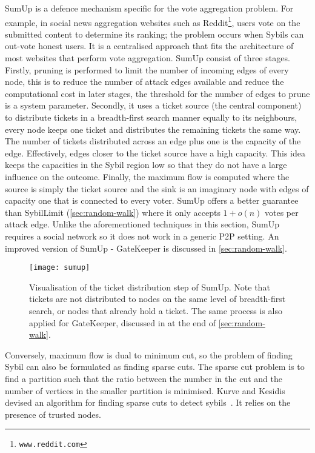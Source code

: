 SumUp\cite{tran2009sybil} is a defence mechanism specific for the vote
aggregation problem. For example, in social news aggregation websites such as
Reddit\footnote{\texttt{www.reddit.com}}, users vote on the submitted content to
determine its ranking; the problem occurs when Sybils can out-vote honest users.
It is a centralised approach that fits the architecture of most websites that
perform vote aggregation. SumUp consist of three stages. Firstly, pruning is
performed to limit the number of incoming edges of every node, this is to reduce
the number of attack edges available and reduce the computational cost in later
stages, the threshold for the number of edges to prune is a system parameter.
Secondly, it uses a ticket source (the central component) to distribute tickets
in a breadth-first search manner equally to its neighbours, every node keeps one
ticket and distributes the remaining tickets the same way. The number of tickets
distributed across an edge plus one is the capacity of the edge. Effectively,
edges closer to the ticket source have a high capacity. This idea keeps the
capacities in the Sybil region low so that they do not have a large influence on
the outcome. Finally, the maximum flow is computed where the source is simply
the ticket source and the sink is an imaginary node with edges of capacity one
that is connected to every voter. SumUp offers a better guarantee than
SybilLimit (\autoref{sec:random-walk}) where it only accepts $1 + o(n)$ votes
per attack edge. Unlike the aforementioned techniques in this section,
SumUp requires a social network so it does not work in a generic P2P setting. An
improved version of SumUp - GateKeeper is discussed in
\autoref{sec:random-walk}.

\begin{figure}
  \centering
  \texttt{[image: sumup]}
  \caption{Visualisation of the ticket distribution step of SumUp. Note that
    tickets are not distributed to nodes on the same level of breadth-first
    search, or nodes that already hold a ticket. The same process is also
    applied for GateKeeper, discussed in at the end of
    \autoref{sec:random-walk}.}
  \label{fig:sumup}
\end{figure}

Conversely, maximum flow is dual to minimum cut, so the problem of finding Sybil
can also be formulated as finding sparse cuts. The sparse cut problem is to find
a partition such that the ratio between the number in the cut and the number of
vertices in the smaller partition is minimised. Kurve and Kesidis devised an
algorithm for finding sparse cuts to detect sybils~\cite{kurve2011sybil}. It
relies on the presence of trusted nodes.

